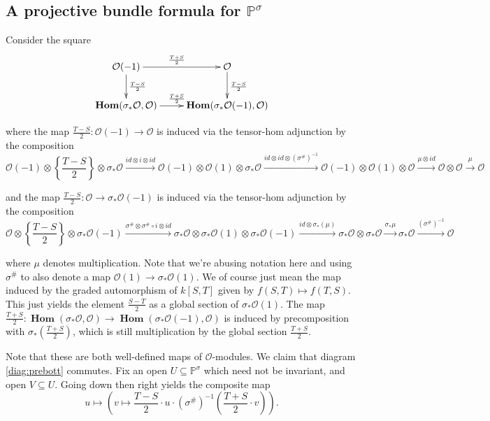 \documentclass[draftthesis,tocnosub,noragright,centerchapter,10pt]{uiucthesis2009}
\newcommand{\mbb}{\mathbb}
\newcommand{\mc}{\mathcal}
\DeclareMathOperator{\iHom}{\mathbf{Hom}}
\theoremstyle{plain}
\theoremstyle{definition}
\begin{document}
\subsection{A projective bundle formula for $\mbb P^\sigma$}


Consider the square
\begin{equation}\label{diag:prebott}
\xymatrix{\mc O(-1)\ar[r]^{\frac{T+S}{2}}\ar[d]^{\frac{T-S}{2}} & \mc O \ar[d]^{\frac{T-S}{2}} \\ \iHom(\sigma_*\mc
  O,\mc O) \ar[r]^{\frac{T+S}{2}} & \iHom(\sigma_* \mc O(-1),\mc O)}
\end{equation}

where the map $\frac{T-S}{2} : \mc O(-1) \rightarrow \mc
O$ is induced via the tensor-hom adjunction by the composition 
\[
\mc O(-1) \otimes \left\{\frac{T-S}{2}\right\} \otimes \sigma_* \mc O
\xrightarrow{id \otimes i \otimes id}
\mc O(-1) \otimes \mc O(1) \otimes \sigma_*\mc O  
\xrightarrow{id \otimes id \otimes (\sigma^\#)^{-1}} \mc O(-1) \otimes
\mc O(1) \otimes \mc O \xrightarrow{\mu \otimes id} \mc O \otimes \mc
O \xrightarrow{\mu} \mc O
\]

and the map  $\frac{T-S}{2} : \mc O \rightarrow \sigma_*\mc
O(-1)$ is induced via the tensor-hom adjunction by the composition 
\[
\mc O \otimes \left\{\frac{T-S}{2}\right\} \otimes \sigma_* \mc O(-1)
\xrightarrow{\sigma^\# \otimes  \sigma^\# \circ i \otimes id}
\sigma_*\mc O \otimes \sigma_*\mc O(1) \otimes \sigma_*\mc O(-1)  
\xrightarrow{ id \otimes \sigma_*(\mu)} \sigma_*\mc O \otimes \sigma_*\mc
O \xrightarrow{\sigma_*\mu} \sigma_*\mc O
\xrightarrow{(\sigma^\#)^{-1}} \mc O
\]

where $\mu$ denotes multiplication. Note that we're abusing notation
here and using $\sigma^\#$ to also denote a map $\mc O(1) \rightarrow
\sigma_* \mc O(1)$. We of course just mean the map induced by the
graded automorphism of $k[S,T]$ given by $f(S,T) \mapsto f(T,S)$. This
just yields the element $\frac{S-T}{2}$ as a global section of
$\sigma_*\mc O(1)$. The map $\frac{T+S}{2} :
\iHom(\sigma_* \mc O, \mc O) \rightarrow \iHom(\sigma_* \mc O(-1),\mc
O)$ is induced by precomposition with $\sigma_*(\frac{T+S}{2})$, which is still
multiplication by the global section $\frac{T+S}{2}$. 

Note that these are both well-defined maps of $\mc O$-modules. We
claim that diagram \ref{diag:prebott} commutes. Fix an open $U
\subseteq \mbb P^\sigma$ which need not be invariant, and open $V
\subseteq U$. Going down then right yields the
composite map
\[
u \mapsto (v \mapsto \frac{T-S}{2} \cdot u \cdot
(\sigma^\#)^{-1}\left(\frac{T+S}{2}\cdot v\right)).
\]
\end{document}
